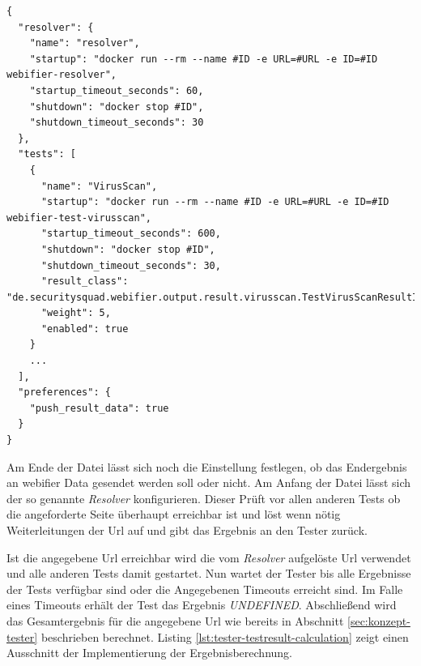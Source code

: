 \begin{scriptsize}
\begin{lstlisting}
{
  "resolver": {
    "name": "resolver",
    "startup": "docker run --rm --name #ID -e URL=#URL -e ID=#ID webifier-resolver",
    "startup_timeout_seconds": 60,
    "shutdown": "docker stop #ID",
    "shutdown_timeout_seconds": 30
  },
  "tests": [
    {
      "name": "VirusScan",
      "startup": "docker run --rm --name #ID -e URL=#URL -e ID=#ID webifier-test-virusscan",
      "startup_timeout_seconds": 600,
      "shutdown": "docker stop #ID",
      "shutdown_timeout_seconds": 30,
      "result_class": "de.securitysquad.webifier.output.result.virusscan.TestVirusScanResultInfo",
      "weight": 5,
      "enabled": true
    }
    ...
  ],
  "preferences": {
    "push_result_data": true
  }
}
\end{lstlisting}
\end{scriptsize}

Am Ende der Datei lässt sich noch die Einstellung festlegen, ob das Endergebnis an webifier Data gesendet werden soll oder nicht. Am Anfang der Datei lässt sich der so genannte \textit{Resolver} konfigurieren. Dieser Prüft vor allen anderen Tests ob die angeforderte Seite überhaupt erreichbar ist und löst wenn nötig Weiterleitungen der Url auf und gibt das Ergebnis an den Tester zurück.

Ist die angegebene Url erreichbar wird die vom \textit{Resolver} aufgelöste Url verwendet und alle anderen Tests damit gestartet. Nun wartet der Tester bis alle Ergebnisse der Tests verfügbar sind oder die Angegebenen Timeouts erreicht sind. Im Falle eines Timeouts erhält der Test das Ergebnis \textit{UNDEFINED}. Abschließend wird das Gesamtergebnis für die angegebene Url wie bereits in Abschnitt \ref{sec:konzept-tester} beschrieben berechnet. Listing \ref{lst:tester-testresult-calculation} zeigt einen Ausschnitt der Implementierung der Ergebnisberechnung.

